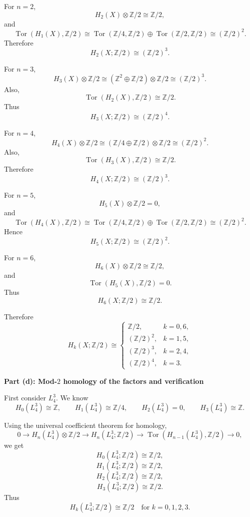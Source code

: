 \begin{solution}
For \(n=2\),
\[
H_2(X)\otimes \mathbb Z/2
\cong
\mathbb Z/2,
\]
and
\[
\operatorname{Tor}(H_1(X),\mathbb Z/2)
\cong
\operatorname{Tor}(\mathbb Z/4,\mathbb Z/2)
\oplus
\operatorname{Tor}(\mathbb Z/2,\mathbb Z/2)
\cong
(\mathbb Z/2)^2.
\]
Therefore
\[
H_2(X;\mathbb Z/2)\cong (\mathbb Z/2)^3.
\]

For \(n=3\),
\[
H_3(X)\otimes \mathbb Z/2
\cong
(\mathbb Z^2\oplus \mathbb Z/2)\otimes \mathbb Z/2
\cong
(\mathbb Z/2)^3.
\]
Also,
\[
\operatorname{Tor}(H_2(X),\mathbb Z/2)
\cong
\mathbb Z/2.
\]
Thus
\[
H_3(X;\mathbb Z/2)\cong (\mathbb Z/2)^4.
\]

For \(n=4\),
\[
H_4(X)\otimes \mathbb Z/2
\cong
(\mathbb Z/4\oplus \mathbb Z/2)\otimes \mathbb Z/2
\cong
(\mathbb Z/2)^2.
\]
Also,
\[
\operatorname{Tor}(H_3(X),\mathbb Z/2)
\cong
\mathbb Z/2.
\]
Therefore
\[
H_4(X;\mathbb Z/2)\cong (\mathbb Z/2)^3.
\]

For \(n=5\),
\[
H_5(X)\otimes \mathbb Z/2=0,
\]
and
\[
\operatorname{Tor}(H_4(X),\mathbb Z/2)
\cong
\operatorname{Tor}(\mathbb Z/4,\mathbb Z/2)
\oplus
\operatorname{Tor}(\mathbb Z/2,\mathbb Z/2)
\cong
(\mathbb Z/2)^2.
\]
Hence
\[
H_5(X;\mathbb Z/2)\cong (\mathbb Z/2)^2.
\]

For \(n=6\),
\[
H_6(X)\otimes \mathbb Z/2
\cong
\mathbb Z/2,
\]
and
\[
\operatorname{Tor}(H_5(X),\mathbb Z/2)=0.
\]
Thus
\[
H_6(X;\mathbb Z/2)\cong \mathbb Z/2.
\]

Therefore
\[
\boxed{
	H_k(X;\mathbb Z/2)\cong
	\begin{cases}
		\mathbb Z/2, & k=0,6,\\[1mm]
		(\mathbb Z/2)^2, & k=1,5,\\[1mm]
		(\mathbb Z/2)^3, & k=2,4,\\[1mm]
		(\mathbb Z/2)^4, & k=3.
\end{cases}}
\]


\medskip
\noindent\textbf{Part (d): Mod-\(2\) homology of the factors and verification}\par
\smallskip


First consider \(L_4^3\). We know
\[
H_0(L_4^3)\cong \mathbb Z,
\qquad
H_1(L_4^3)\cong \mathbb Z/4,
\qquad
H_2(L_4^3)=0,
\qquad
H_3(L_4^3)\cong \mathbb Z.
\]

Using the universal coefficient theorem for homology,
\[
0
\longrightarrow
H_n(L_4^3)\otimes \mathbb Z/2
\longrightarrow
H_n(L_4^3;\mathbb Z/2)
\longrightarrow
\operatorname{Tor}(H_{n-1}(L_4^3),\mathbb Z/2)
\longrightarrow
0,
\]
we get
\[
H_0(L_4^3;\mathbb Z/2)\cong \mathbb Z/2,
\]
\[
H_1(L_4^3;\mathbb Z/2)\cong \mathbb Z/2,
\]
\[
H_2(L_4^3;\mathbb Z/2)\cong \mathbb Z/2,
\]
\[
H_3(L_4^3;\mathbb Z/2)\cong \mathbb Z/2.
\]
Thus
\[
\boxed{
	H_k(L_4^3;\mathbb Z/2)\cong \mathbb Z/2
	\quad\text{for }k=0,1,2,3.}
\]


\end{solution}
